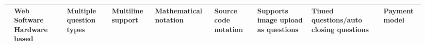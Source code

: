 

\begin{landscape}
\thispagestyle{empty}
    \begin{center}
        \begin{table}[H]
            \begin{tabularx}{\paperwidth}{ |X|X|X|X|X|X|X|X|X| } 
             \hline
                 & Web \newline Software \newline Hardware based & Multiple question types & Multiline support & Mathematical notation & Source code notation & Supports image upload as questions & Timed questions/auto closing questions & Payment model \\ \hline
                 

\end{tabularx}
\end{table}
\end{center}
\end{landscape}
